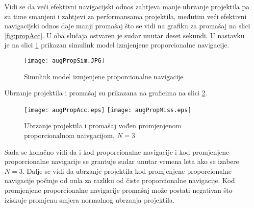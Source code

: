Vidi se da veći efektivni navigacijski odnos zahtjeva manje ubrzanje projektila pa su time 
smanjeni i zahtjevi za performansama projektila, međutim veći efektivni navigacijski odnos 
daje manji promašaj što se vidi na grafiku za promašaj na slici \ref{fig:propAcc}. 
U oba slučaja ostvaren je sudar unutar deset sekundi. U nastavku je na slici \ref{fig:simAugProp} prikazan 
simulink model izmjenjene proporcionalne navigacije.
\begin{figure}[!ht]
    \centering
    \texttt{[image: augPropSim.JPG]}
    \caption{Simulink model izmjenjene proporcionalne navigacije}
    \label{fig:simAugProp}
\end{figure}
Ubrzanje projektila i promašaj su prikazana na graficima na slici \ref{fig:augPropGraf}.
\begin{figure}[!ht]
    \centering
    \texttt{[image: augPropAcc.eps]}
    \texttt{[image: augPropMiss.eps]}
    \caption{Ubrzanje projektila i promašaj vođen promjenjenom proporcionalnom naivgacijom, $N=3$}
    \label{fig:augPropGraf}
\end{figure}
Sada se konačno vidi da i kod proporcionalne navigacije i kod promjenjene proporcionalne navigacije 
se grantuje sudar unutar vrmena leta ako se izabere $N=3$. Dalje se vidi da 
ubrzanje projektila kod promjenjene proporcionalne navigacije počinje od nula za razliku od čiste proporcionalne 
navigacije. Kod promjenjene proporcionalne navigacije promašaj može postati negativan što iziskuje 
promjenu smjera normalnog ubrzanja projektila. 

